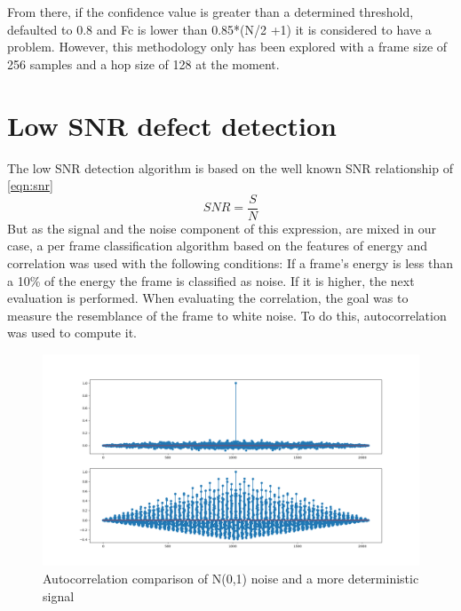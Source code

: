 From there, if the confidence value is greater than a determined threshold, defaulted to 0.8 and Fc is lower than 0.85*(N/2 +1) it is considered 
to have a problem. However, this methodology only has been explored with a frame size of 256 samples and a hop size of 128 at the moment.


\section{Low SNR defect detection}
The low SNR detection algorithm is based on the well known SNR relationship of \ref{eqn:snr}
\begin{equation}\label{eqn:snr}
	SNR = \frac{S}{N}
\end{equation}
But as the signal and the noise component of this expression, are mixed in our case, a per frame classification algorithm based on the features 
of energy and correlation was used with the following conditions: 
If a frame’s energy is less than a 10\% of the energy the frame is classified as noise. If it is higher, the next evaluation is performed.
When evaluating the correlation, the goal was to measure the resemblance of the frame to white noise. To do this, autocorrelation was used to compute it. 

\begin{figure}[!ht]
	\includegraphics[clip,width=\columnwidth]{Figures/correlation.png}%
	\caption{Autocorrelation comparison of N(0,1) noise and a more deterministic signal}
	\label{fig:accomp}
\end{figure}

